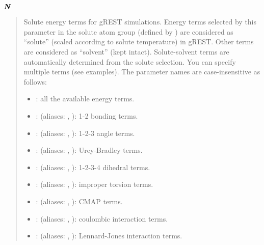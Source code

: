 \documentclass[a4paper,11pt,oneside,english]{sphinxmanual}
\begin{document}
\(\textbf{\textit{N}}\) 
\begin{quote}


Solute energy terms for gREST  simulations.
Energy terms selected by this parameter in the solute atom group
(defined by ) are considered as “solute”
(scaled according to solute temperature) in
gREST. Other terms are considered as “solvent” (kept intact).
Solute-solvent terms are automatically determined from the solute
selection. You can specify multiple terms (see examples).
The parameter names are case-insensitive as follows:
\begin{itemize}
\item {} 
: all the available energy terms.

\item {} 
: (aliases: , ): 1-2 bonding terms.

\item {} 
: (aliases: , ): 1-2-3 angle terms.

\item {} 
: (aliases: , ): Urey-Bradley terms.

\item {} 
: (aliases: , ): 1-2-3-4 dihedral terms.

\item {} 
: (aliases: , ): improper torsion terms.

\item {} 
: (aliases: , ): CMAP terms.

\item {} 
: (aliases: , ): coulombic interaction terms.

\item {} 
: (aliases: , ): Lennard-Jones interaction terms.

\end{itemize}
\end{quote}
\end{document}
